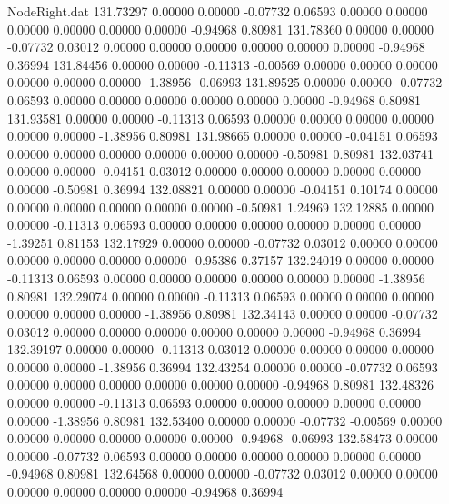 \begin{filecontents}{NodeRight.dat}
 131.73297    0.00000    0.00000    -0.07732    0.06593    0.00000    0.00000    0.00000    0.00000    0.00000    0.00000   -0.94968    0.80981
 131.78360    0.00000    0.00000    -0.07732    0.03012    0.00000    0.00000    0.00000    0.00000    0.00000    0.00000   -0.94968    0.36994
 131.84456    0.00000    0.00000    -0.11313   -0.00569    0.00000    0.00000    0.00000    0.00000    0.00000    0.00000   -1.38956   -0.06993
 131.89525    0.00000    0.00000    -0.07732    0.06593    0.00000    0.00000    0.00000    0.00000    0.00000    0.00000   -0.94968    0.80981
 131.93581    0.00000    0.00000    -0.11313    0.06593    0.00000    0.00000    0.00000    0.00000    0.00000    0.00000   -1.38956    0.80981
 131.98665    0.00000    0.00000    -0.04151    0.06593    0.00000    0.00000    0.00000    0.00000    0.00000    0.00000   -0.50981    0.80981
 132.03741    0.00000    0.00000    -0.04151    0.03012    0.00000    0.00000    0.00000    0.00000    0.00000    0.00000   -0.50981    0.36994
 132.08821    0.00000    0.00000    -0.04151    0.10174    0.00000    0.00000    0.00000    0.00000    0.00000    0.00000   -0.50981    1.24969
 132.12885    0.00000    0.00000    -0.11313    0.06593    0.00000    0.00000    0.00000    0.00000    0.00000    0.00000   -1.39251    0.81153
 132.17929    0.00000    0.00000    -0.07732    0.03012    0.00000    0.00000    0.00000    0.00000    0.00000    0.00000   -0.95386    0.37157
 132.24019    0.00000    0.00000    -0.11313    0.06593    0.00000    0.00000    0.00000    0.00000    0.00000    0.00000   -1.38956    0.80981
 132.29074    0.00000    0.00000    -0.11313    0.06593    0.00000    0.00000    0.00000    0.00000    0.00000    0.00000   -1.38956    0.80981
 132.34143    0.00000    0.00000    -0.07732    0.03012    0.00000    0.00000    0.00000    0.00000    0.00000    0.00000   -0.94968    0.36994
 132.39197    0.00000    0.00000    -0.11313    0.03012    0.00000    0.00000    0.00000    0.00000    0.00000    0.00000   -1.38956    0.36994
 132.43254    0.00000    0.00000    -0.07732    0.06593    0.00000    0.00000    0.00000    0.00000    0.00000    0.00000   -0.94968    0.80981
 132.48326    0.00000    0.00000    -0.11313    0.06593    0.00000    0.00000    0.00000    0.00000    0.00000    0.00000   -1.38956    0.80981
 132.53400    0.00000    0.00000    -0.07732   -0.00569    0.00000    0.00000    0.00000    0.00000    0.00000    0.00000   -0.94968   -0.06993
 132.58473    0.00000    0.00000    -0.07732    0.06593    0.00000    0.00000    0.00000    0.00000    0.00000    0.00000   -0.94968    0.80981
 132.64568    0.00000    0.00000    -0.07732    0.03012    0.00000    0.00000    0.00000    0.00000    0.00000    0.00000   -0.94968    0.36994

\end{filecontents}
